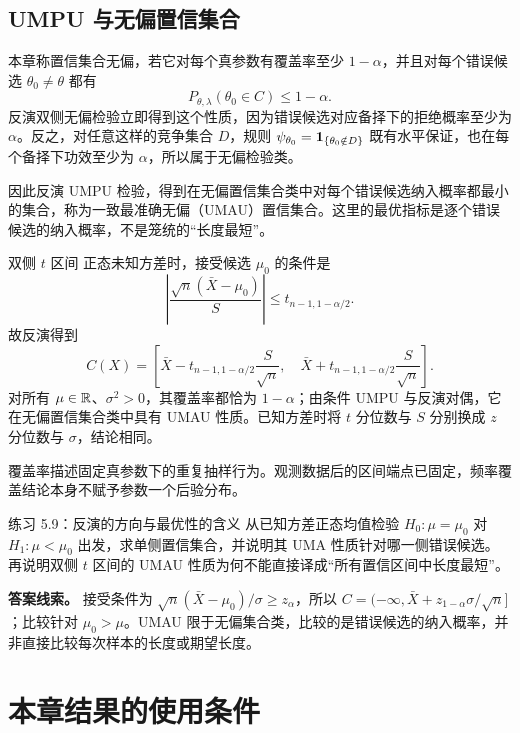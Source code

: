 \subsection{UMPU 与无偏置信集合}

本章称置信集合无偏，若它对每个真参数有覆盖率至少 $1-\alpha$，并且对每个错误候选 $\theta_0\ne\theta$ 都有
\[
 P_{\theta,\lambda}(\theta_0\in C)\le1-\alpha.
\]
反演双侧无偏检验立即得到这个性质，因为错误候选对应备择下的拒绝概率至少为 $\alpha$。反之，对任意这样的竞争集合 $D$，规则
$\psi_{\theta_0}=\mathbf 1_{\{\theta_0\notin D\}}$ 既有水平保证，也在每个备择下功效至少为 $\alpha$，所以属于无偏检验类。

因此反演 UMPU 检验，得到在无偏置信集合类中对每个错误候选纳入概率都最小的集合，称为一致最准确无偏（UMAU）置信集合。这里的最优指标是逐个错误候选的纳入概率，不是笼统的“长度最短”。

\begin{examplebox}{双侧 $t$ 区间}
正态未知方差时，接受候选 $\mu_0$ 的条件是
\[
 \left|\frac{\sqrt n(\bar X-\mu_0)}S\right|
 \le t_{n-1,1-\alpha/2}.
\]
故反演得到
\[
 C(X)=\left[\bar X-t_{n-1,1-\alpha/2}\frac S{\sqrt n},\quad
                 \bar X+t_{n-1,1-\alpha/2}\frac S{\sqrt n}\right].
\]
对所有 $\mu\in\mathbb R$、$\sigma^2>0$，其覆盖率都恰为 $1-\alpha$；由条件 UMPU 与反演对偶，它在无偏置信集合类中具有 UMAU 性质。已知方差时将 $t$ 分位数与 $S$ 分别换成 $z$ 分位数与 $\sigma$，结论相同。

覆盖率描述固定真参数下的重复抽样行为。观测数据后的区间端点已固定，频率覆盖结论本身不赋予参数一个后验分布。
\end{examplebox}

\begin{examplebox}{练习 5.9：反演的方向与最优性的含义}
从已知方差正态均值检验 $H_0:\mu=\mu_0$ 对 $H_1:\mu<\mu_0$ 出发，求单侧置信集合，并说明其 UMA 性质针对哪一侧错误候选。再说明双侧 $t$ 区间的 UMAU 性质为何不能直接译成“所有置信区间中长度最短”。

\textbf{答案线索。} 接受条件为 $\sqrt n(\bar X-\mu_0)/\sigma\ge z_\alpha$，所以
$C=(-\infty,\bar X+z_{1-\alpha}\sigma/\sqrt n]$；比较针对 $\mu_0>\mu$。UMAU 限于无偏集合类，比较的是错误候选的纳入概率，并非直接比较每次样本的长度或期望长度。
\end{examplebox}

\section{本章结果的使用条件}

